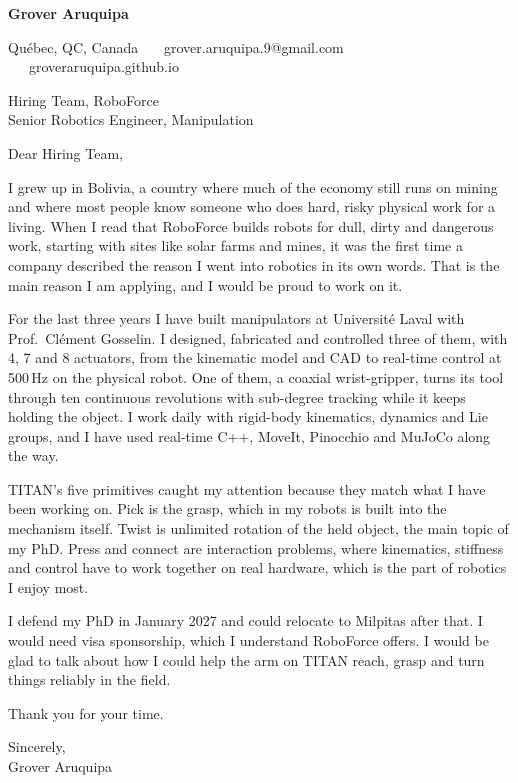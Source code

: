 \documentclass[11pt,letterpaper]{article}
\begin{document}
{\large\bfseries Grover Aruquipa}\par\vspace{-6pt}
{\small Qu\'ebec, QC, Canada \ \textbullet\ \ grover.aruquipa.9@gmail.com \ \textbullet\ \ groveraruquipa.github.io}

\vspace{6pt}
Hiring Team, RoboForce\\
Senior Robotics Engineer, Manipulation

Dear Hiring Team,

I grew up in Bolivia, a country where much of the economy still runs on mining and where most people know someone who does hard, risky physical work for a living. When I read that RoboForce builds robots for dull, dirty and dangerous work, starting with sites like solar farms and mines, it was the first time a company described the reason I went into robotics in its own words. That is the main reason I am applying, and I would be proud to work on it.

For the last three years I have built manipulators at Universit\'e Laval with Prof.\ Cl\'ement Gosselin. I designed, fabricated and controlled three of them, with 4, 7 and 8 actuators, from the kinematic model and CAD to real-time control at 500\,Hz on the physical robot. One of them, a coaxial wrist-gripper, turns its tool through ten continuous revolutions with sub-degree tracking while it keeps holding the object. I work daily with rigid-body kinematics, dynamics and Lie groups, and I have used real-time C++, MoveIt, Pinocchio and MuJoCo along the way.

TITAN's five primitives caught my attention because they match what I have been working on. Pick is the grasp, which in my robots is built into the mechanism itself. Twist is unlimited rotation of the held object, the main topic of my PhD. Press and connect are interaction problems, where kinematics, stiffness and control have to work together on real hardware, which is the part of robotics I enjoy most.

I defend my PhD in January 2027 and could relocate to Milpitas after that. I would need visa sponsorship, which I understand RoboForce offers. I would be glad to talk about how I could help the arm on TITAN reach, grasp and turn things reliably in the field.

Thank you for your time.

Sincerely,\\
Grover Aruquipa
\end{document}
